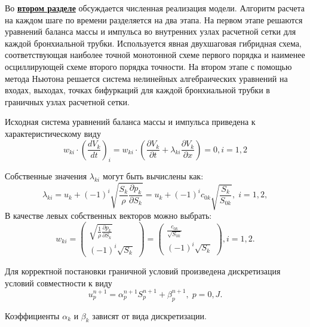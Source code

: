 Во \underline{\textbf{втором разделе}} обсуждается численная реализация модели.
Алгоритм расчета на каждом шаге по времени разделяется на два этапа.  На первом этапе решаются уравнений баланса массы и импульса во внутренних узлах расчетной сетки для каждой бронхиальной трубки. Используется явная двухшаговая гибридная схема, соответствующая наиболее точной монотонной схеме первого порядка и наименее осциллирующей схеме второго порядка точности. На втором этапе с помощью метода Ньютона решается система нелинейных алгебраических уравнений на входах, выходах, точках бифуркаций для каждой бронхиальной трубки в граничных узлах расчетной сетки.

Исходная система уравнений баланса массы и импульса приведена к характеристическому виду
\begin{equation}
w_{ki} \cdot \left(\frac{dV_{k} }{dt} \right)_{i} =w_{ki} \cdot \left(\frac{\partial V_{k} }{\partial t} +\lambda _{ki} \frac{\partial V_{k} }{\partial x} \right)=0, i=1,2 
\end{equation}

Собственные значения  $\lambda_{ki}$ могут быть вычислены как:
\begin{equation} 
\lambda _{ki} =u_{k} +\left(-1\right)^{i} \sqrt{\frac{S_{k} }{\rho } \frac{\partial p_{k} }{\partial S_{k} } } =u_{k} +\left(-1\right)^{i} c_{0k} \sqrt{\frac{S_{k} }{S_{0k} } } ,\; i=1,2,  
\end{equation} 
В качестве левых собственных векторов можно выбрать:
\begin{equation} 
w_{ki} =\left(\begin{array}{c} {\sqrt{\frac{1}{\rho } \frac{\partial p_{k} }{\partial S_{k} } } } \\ {\left(-1\right)^{i} \sqrt{S_{k} } } \end{array}\right)=\left(\begin{array}{c} {\frac{c_{0k} }{\sqrt{S_{0k} } } } \\ {\left(-1\right)^{i} \sqrt{S_{k} } } \end{array}\right), i=1,2.  
\end{equation}

Для корректной постановки граничной условий произведена дискретизация условий совместности к виду
\begin{equation} 
u_{p}^{n+1} =\alpha _{p}^{n+1} S_{p}^{n+1} +\beta _{p}^{n+1} ,\; p=0,J.  
\end{equation} 

Коэффициенты $\alpha_k$ и $\beta_k$ зависят от вида дискретизации. 

